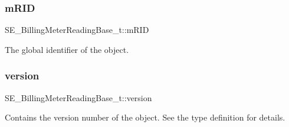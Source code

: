 \subsubsection{\texorpdfstring{m\+R\+ID}{mRID}}
{\footnotesize\ttfamily S\+E\+\_\+\+Billing\+Meter\+Reading\+Base\+\_\+t\+::m\+R\+ID}

The global identifier of the object. \mbox{\label{group__BillingMeterReadingBase_gaf9273eafca8a17231e43186c95b13cb0}} 
\subsubsection{\texorpdfstring{version}{version}}
{\footnotesize\ttfamily S\+E\+\_\+\+Billing\+Meter\+Reading\+Base\+\_\+t\+::version}

Contains the version number of the object. See the type definition for details. 